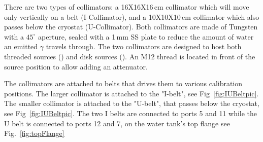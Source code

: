 \begin{figure}
\begin{minipage}[c]{0.4\textwidth}
    \end{minipage} 
    \label{fig:Colimator}
\end{figure}

There are two types of collimators: a 16X16X16\,cm collimator which will move only vertically on a belt (I-Collimator), and a 10X10X10\,cm collimator which also passes below the cryostat (U-Collimator). 
Both collimators are made of Tungsten with a $45^{\circ}$ aperture, sealed with a 1\,mm SS plate to reduce the amount of water an emitted $\gamma$ travels through. 
The two collimators are designed to host both threaded sources (\Th) and disk sources (\Cs). An M12 thread is located in front of the  
source position to allow adding an attenuator.
 
The collimators are attached to belts that drives them to various calibration positions. The larger collimator is attached to the "I-belt", see Fig~\ref{fig:IUBeltpic}. The smaller collimator is attached to the "U-belt", that passes below the cryostat, see Fig~\ref{fig:IUBeltpic}. The two I belts are connected to ports 5 and 11 while the U belt is connected to ports 12 and 7, on the water tank's top flange see Fig.~\ref{fig:topFlange} 


